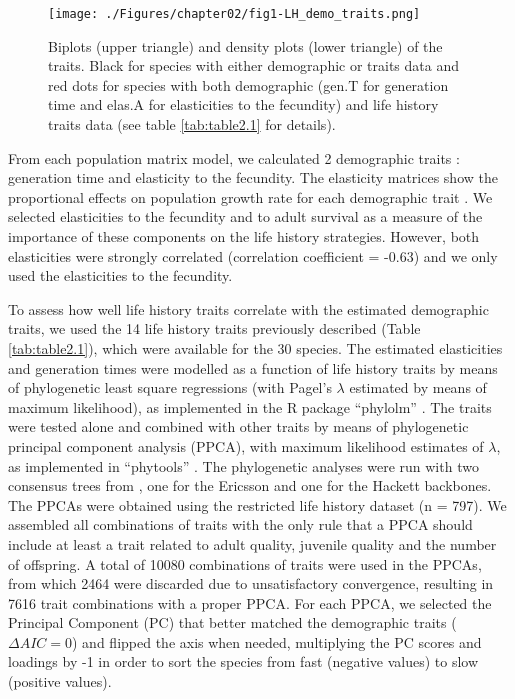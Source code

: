 \begin{figure}
\centering
\texttt{[image: ./Figures/chapter02/fig1-LH\_demo\_traits.png]}
\caption[Traits distribution]{
Biplots (upper triangle) and density plots (lower triangle) of the traits. 
Black for species with either demographic or traits data and red dots for 
species with both demographic (gen.T for generation time and elas.A for 
elasticities to the fecundity) and life history traits data (see table
\ref{tab:table2.1} for details).}
\label{fig:fig2.1}
\end{figure}


From each population matrix model, we calculated 2 demographic 
traits \citep{Caswell2001,Stubben2007}: generation time and elasticity to the
fecundity. The elasticity matrices show the proportional effects on 
population growth rate for each demographic trait \citep{deKroon2000}⁠. We 
selected elasticities to the fecundity and to adult survival as a measure of
the importance of these components on the life history strategies. However, both
elasticities were strongly correlated (correlation coefficient = -0.63) and we only
used the elasticities to the fecundity.

To assess how well life history traits correlate with the estimated demographic 
traits, we used the 14 life history traits previously described (Table 
\ref{tab:table2.1}), which were available for the 30 species. The estimated 
elasticities and generation times were modelled as a function of life history 
traits by means of phylogenetic least square regressions (with Pagel’s 
$\lambda$ estimated by means of maximum likelihood), as implemented in the R 
package “phylolm” \citep{Ho2014}⁠. The traits were tested alone and combined 
with other traits by means of phylogenetic principal component analysis 
(PPCA), with maximum likelihood estimates of $\lambda$, as implemented in 
“phytools” \citep{Revell2009a}⁠. The phylogenetic analyses were run with 
two consensus trees from \citet{Jetz2012}, one for the Ericsson and one for the
Hackett backbones.
The PPCAs were obtained using the restricted life history dataset (n = 797). We
assembled all combinations of traits with the only rule that a PPCA should 
include at least a trait related to adult quality, juvenile quality and the 
number of offspring. A total of 10080 combinations of traits were used in the 
PPCAs, from which 2464 were discarded due to unsatisfactory convergence, 
resulting in 7616 trait combinations with a proper PPCA. For each PPCA, we 
selected the Principal Component (PC) that better matched the demographic
traits ($\Delta AIC = 0$) and flipped the axis when needed, multiplying the PC
scores and loadings by -1 in order to sort the species from fast (negative
values) to slow (positive values).

